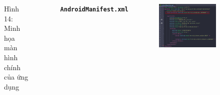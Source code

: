 \documentclass{beamer}
\begin{document}
\begin{frame}
\begin{columns}
\begin{figure}
            \caption{\centering\tiny{Hình 14: Minh họa màn hình chính của ứng dụng}}
        \end{figure}
        \indent \textbf{\texttt{AndroidManifest.xml}}
        \begin{figure}
            \centering
            \includegraphics[width=\textwidth]{images/12.png}
        \end{figure}
    \end{columns}
\end{frame}
\end{document}
